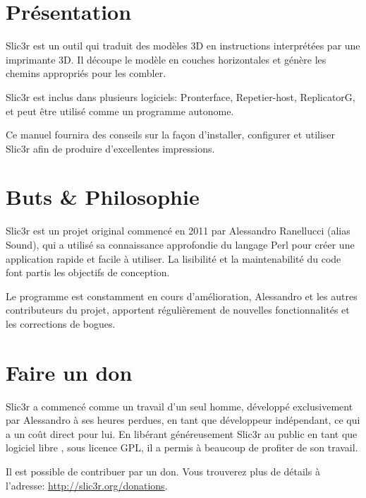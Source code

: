 
\section{Pr\'esentation} %
\label{sec:overview}

Slic3r est un outil qui traduit des mod\`eles 3D en instructions interpr\'et\'ees par une imprimante 3D. Il d\'ecoupe le mod\`ele en couches horizontales et g\'en\`ere les chemins appropri\'es pour les combler.

Slic3r est inclus dans plusieurs logiciels: Pronterface, Repetier-host, ReplicatorG, et peut \^etre utilis\'e comme un programme autonome.

Ce manuel fournira des conseils sur la fa\c{c}on d'installer, configurer et utiliser Slic3r afin de produire d'excellentes impressions.



\section{Buts \& Philosophie} %
\label{sec:goals_philosophy}

Slic3r est un projet original commenc\'e en 2011 par Alessandro Ranellucci (alias Sound), qui a utilis\'e sa connaissance approfondie du langage Perl pour cr\'eer une application rapide et facile \`a utiliser. La lisibilit\'e et la maintenabilit\'e du code font partis les objectifs de conception.

Le programme est constamment en cours d'am\'elioration, Alessandro et les autres contributeurs du projet, apportent r\'eguli\`erement de nouvelles fonctionnalit\'es et les corrections de bogues.



\section{Faire un don} %
\label{sec:donating}

Slic3r a commenc\'e comme un travail d'un seul homme, d\'evelopp\'e exclusivement par Alessandro \`a ses heures perdues, en tant que d\'eveloppeur ind\'ependant, ce qui a un co\^ut direct pour lui. En lib\'erant g\'en\'ereusement Slic3r au public en tant que logiciel libre , sous licence GPL, il a permis \`a beaucoup de profiter de son travail.

Il est possible de contribuer par un don. Vous trouverez plus de d\'etails \`a l'adresse: \url{http://slic3r.org/donations}.



